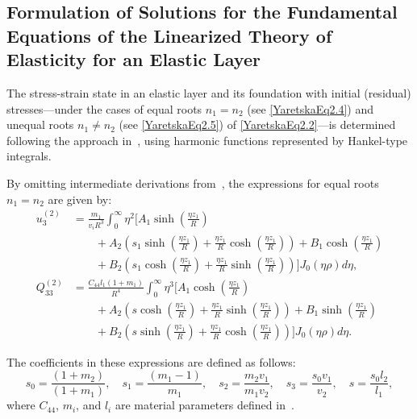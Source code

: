 \subsection{Formulation of Solutions for the Fundamental Equations of the Linearized Theory of Elasticity for an Elastic Layer}

The stress-strain state in an elastic layer and its foundation with initial (residual) stresses—under the cases of equal roots $n_1 = n_2$ (see \eqref{YaretskaEq2.4}) and unequal roots $n_1 \ne n_2$ (see \eqref{YaretskaEq2.5}) of \eqref{YaretskaEq2.2}—is determined following the approach in~\cite{YaretskaRef1}, using harmonic functions represented by Hankel-type integrals.

By omitting intermediate derivations from~\cite{YaretskaRef1}, the expressions for equal roots $n_1 = n_2$ are given by:
\begin{equation}\label{YaretskaEq2.2.1}
\begin{aligned}
	u_3^{(2)} &= \frac{m_1}{v_i R^3} \int_0^{\infty} \eta^2 \bigg[
	A_1 \sinh\left(\frac{\eta z_1}{R}\right)
	 \\
	&\qquad+ A_2 \left( s_1 \sinh\left(\frac{\eta z_1}{R} \right) + \frac{\eta z_1}{R} \cosh\left(\frac{\eta z_1}{R} \right) \right) 
	 + B_1 \cosh\left(\frac{\eta z_1}{R} \right)
	 \\
	&\qquad+ B_2 \left( s_1 \cosh\left(\frac{\eta z_1}{R} \right) + \frac{\eta z_1}{R} \sinh\left(\frac{\eta z_1}{R} \right) \right)
	\bigg] J_0(\eta \rho)  d\eta,  
	\\
	Q_{33}^{(2)} &= \frac{C_{44} l_1 (1 + m_1)}{R^4} \int_0^{\infty} \eta^3 \bigg[
	A_1 \cosh\left(\frac{\eta z_1}{R} \right)
	 \\
	&\qquad+ A_2 \left( s \cosh\left(\frac{\eta z_1}{R} \right) + \frac{\eta z_1}{R} \sinh\left(\frac{\eta z_1}{R} \right) \right) 
	+ B_1 \sinh\left(\frac{\eta z_1}{R} \right)
	\\
	&\qquad+ B_2 \left( s \sinh\left(\frac{\eta z_1}{R} \right) + \frac{\eta z_1}{R} \cosh\left(\frac{\eta z_1}{R} \right) \right)
	\bigg] J_0(\eta \rho)  d\eta.
\end{aligned}
\end{equation}

The coefficients in these expressions are defined as follows:
\[
s_0 = \frac{(1 + m_2)}{(1 + m_1)}, \quad
s_1 = \frac{(m_1 - 1)}{m_1}, \quad
s_2 = \frac{m_2 v_1}{m_1 v_2}, \quad
s_3 = \frac{s_0 v_1}{v_2}, \quad
s = \frac{s_0 l_2}{l_1},
\]
where $C_{44}$, $m_i$, and $l_i$ are material parameters defined in~\cite{YaretskaRef16}.

